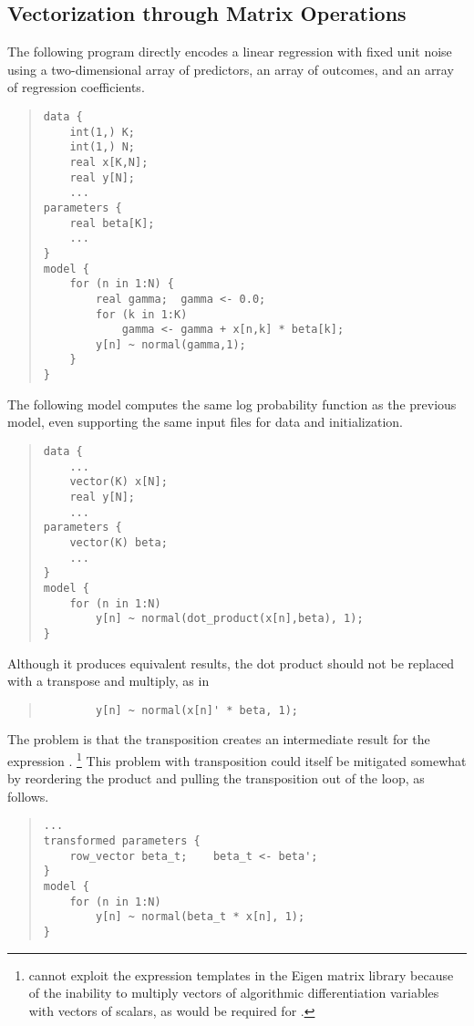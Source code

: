 \subsection{Vectorization through Matrix Operations}

The following program directly encodes a linear regression with fixed
unit noise using a two-dimensional array  of predictors, an
array  of outcomes, and an array  of regression
coefficients.
%
\begin{quote}
\begin{Verbatim}
data {
    int(1,) K;
    int(1,) N;
    real x[K,N];
    real y[N];
    ...
parameters {
    real beta[K];
    ...
}
model {
    for (n in 1:N) {
        real gamma;  gamma <- 0.0;
        for (k in 1:K)
            gamma <- gamma + x[n,k] * beta[k];
        y[n] ~ normal(gamma,1);
    }
}
\end{Verbatim}
\end{quote}
%
The following model computes the same log probability function as the
previous model, even supporting the same input files for data and
initialization.
%
\begin{quote}
\begin{Verbatim} 
data {
    ...
    vector(K) x[N];
    real y[N];
    ...
parameters {
    vector(K) beta;
    ...
}
model {
    for (n in 1:N)
        y[n] ~ normal(dot_product(x[n],beta), 1);
}
\end{Verbatim}
\end{quote}
%
Although it produces equivalent results, the dot product should not be
replaced with a transpose and multiply, as in
%
\begin{quote}
\begin{Verbatim} 
        y[n] ~ normal(x[n]' * beta, 1);
\end{Verbatim}
\end{quote}
%
The problem is that the transposition creates an intermediate result
for the expression .%
%
\footnote{\Stan cannot exploit the expression templates in the Eigen
  matrix library because of the inability to multiply vectors of
  algorithmic differentiation variables with vectors of scalars, as
  would be required for .}
%
This problem with transposition could itself be mitigated somewhat by
reordering the product and pulling the transposition out of the loop,
as follows.
%
\begin{quote}
\begin{Verbatim} 
...
transformed parameters {
    row_vector beta_t;    beta_t <- beta';
}
model {
    for (n in 1:N)
        y[n] ~ normal(beta_t * x[n], 1);
}
\end{Verbatim}
\end{quote}
